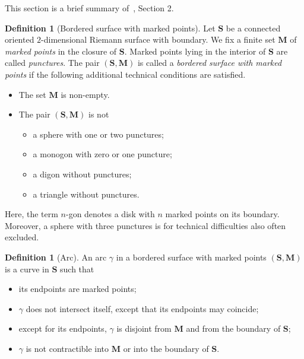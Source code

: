 \documentclass[a4paper,oneside,svgnames]{amsart}
\theoremstyle{plain}
\theoremstyle{definition}
\newtheorem{definition}[theorem]{Definition}
\begin{document}
 This section is a brief summary of~\cite{fst}, Section 2.
 \begin{definition}[Bordered surface with marked points]
  \label{def:marked-surface}
  Let $\mathbf{S}$ be a connected oriented $2$-dimensional Riemann surface with
  boundary. We fix a finite set $\mathbf{M}$ of \emph{marked points} in the
  closure of $\mathbf{S}$. Marked points lying in the interior of $\mathbf{S}$
  are called \emph{punctures}. The pair $(\mathbf{S},\mathbf{M})$ is called a
  \emph{bordered surface with marked points} if the following additional
  technical conditions are satisfied.
  \begin{itemize}
   \item The set $\mathbf{M}$ is non-empty.
   \item The pair $(\mathbf{S}, \mathbf{M})$ is not
   \begin{itemize}
    \item a sphere with one or two punctures;
    \item a monogon with zero or one puncture;
    \item a digon without punctures;
    \item a triangle without punctures.
   \end{itemize}
  \end{itemize}
  Here, the term $n$-gon denotes a disk with $n$ marked points on its boundary.
  Moreover, a sphere with three punctures is for technical difficulties also
  often excluded.
 \end{definition}

 \begin{definition}[Arc]
  \label{def:arc}
  An arc $\gamma$ in a bordered surface with marked points
  $(\mathbf{S},\mathbf{M})$ is a curve in $\mathbf{S}$ such that
  \begin{itemize}
   \item its endpoints are marked points;
   \item $\gamma$ does not intersect itself, except that its endpoints may
    coincide;
   \item except for its endpoints, $\gamma$ is disjoint from $\mathbf{M}$ and
    from the boundary of $\mathbf{S}$;
   \item $\gamma$ is not contractible into $\mathbf{M}$ or into the boundary of
    $\mathbf{S}$.
  \end{itemize}
 \end{definition}
\end{document}
